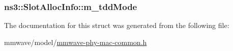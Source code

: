 \subsubsection[{\texorpdfstring{m\+\_\+tdd\+Mode}{m_tddMode}}]{ ns3\+::\+Slot\+Alloc\+Info\+::m\+\_\+tdd\+Mode}\hypertarget{structns3_1_1SlotAllocInfo_adc9f78d415fa8b809b24ae7dd42ba2de}{}\label{structns3_1_1SlotAllocInfo_adc9f78d415fa8b809b24ae7dd42ba2de}


The documentation for this struct was generated from the following file\+:\begin{DoxyCompactItemize}
\item 
mmwave/model/\hyperlink{mmwave-phy-mac-common_8h}{mmwave-\/phy-\/mac-\/common.\+h}\end{DoxyCompactItemize}
